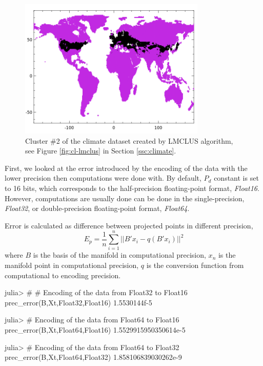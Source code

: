 \begin{figure}[H]
\centering
\includegraphics[width=3.5in]{img/CL02.png}
\caption{Cluster \#2 of the climate dataset created by LMCLUS algorithm, see Figure \ref{fig:cl-lmclus} in Section \ref{ssc:climate}.}
\label{fig:cl-lmclus-c2}
\end{figure}

First, we looked at the error introduced by the encoding of the data with
the lower precision then computations were done with. By default, $P_d$ constant
is set to 16 bits, which corresponds to the half-precision floating-point format,
\emph{Float16}. However, computations are usually done can be done in
the single-precision, \emph{Float32}, or double-precision floating-point format,
\emph{Float64}.

Error is calculated as difference between projected points in different
precision,
\begin{equation}
E_p = \frac{1}{n} \sum^n_{i=1} || B'x_i - q(B'x_i) ||^2
\end{equation}
where $B$ is the basis of the manifold in computational precision,
$x_n$ is the manifold point in computational precision,
$q$ is the conversion function from computational to encoding precision.


\begin{juliaterm}
julia> #
# Encoding of the data from Float32 to Float16
prec_error(B,Xt,Float32,Float16)
1.5530144f-5

julia> 
# Encoding of the data from Float64 to Float16
prec_error(B,Xt,Float64,Float16)
1.5529915950350614e-5

julia> 
# Encoding of the data from Float64 to Float32
prec_error(B,Xt,Float64,Float32)
1.858106839030262e-9

\end{juliaterm}



